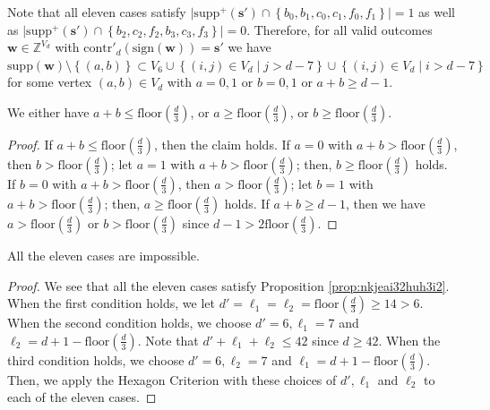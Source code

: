 Note that all eleven cases satisfy \( \lvert \mathrm{supp}^+(\mathbf{s}') \cap \left\{b_0, b_1, c_0, c_1, f_0, f_1 \right\} \rvert = 1 \) as well as \( \lvert \mathrm{supp}^+(\mathbf{s}') \cap \left\{b_2, c_2, f_2, b_3, c_3, f_3 \right\} \rvert = 0 \).
Therefore, for all valid outcomes \( \mathbf{w} \in \mathbb{Z}^{V_d} \) with \( \mathrm{contr}'_d(\mathrm{sign}(\mathbf{w})) = \mathbf{s}' \) we have \( \mathrm{supp}(\mathbf{w}) \setminus \left\{ (a,b) \right\} \subset V_6 \cup \left\{ (i,j) \in V_d \mid j > d - 7 \right\}  \cup \left\{ (i,j) \in V_d \mid i > d - 7 \right\}  \)
for some vertex \( (a,b) \in V_d \) with \( a = 0,1 \) or \( b=0,1 \) or \( a + b \geq d-1 \).

\begin{proposition}\label{prop:nkjeai32huh3i2}
    We either have  \( a + b \leq \mathrm{floor}(\frac{d}{3}) \), or \( a \geq \mathrm{floor}(\frac{d}{3}) \), or \( b \geq \mathrm{floor}(\frac{d}{3}) \).
\end{proposition}

\begin{proof}
    If \( a + b \leq \mathrm{floor}(\frac{d}{3}) \), then the claim holds. If \( a = 0 \) with \( a + b > \mathrm{floor}(\frac{d}{3}) \), then \( b > \mathrm{floor}(\frac{d}{3}) \); let \( a = 1 \) with \( a + b > \mathrm{floor}(\frac{d}{3}) \); then, \( b \geq \mathrm{floor}(\frac{d}{3}) \) holds. If \( b = 0 \) with \( a + b > \mathrm{floor}(\frac{d}{3}) \), then \( a > \mathrm{floor}(\frac{d}{3}) \); let \( b = 1 \) with \( a + b > \mathrm{floor}(\frac{d}{3}) \); then, \( a \geq \mathrm{floor}(\frac{d}{3}) \) holds. If \( a + b \geq d-1  \), then we have \( a > \mathrm{floor}(\frac{d}{3}) \) or \( b > \mathrm{floor}(\frac{d}{3}) \) since \( d-1 > 2 \mathrm{floor}(\frac{d}{3}) \).
\end{proof}

\begin{proposition}
    All the eleven cases are impossible.
\end{proposition}

\begin{proof}
    We see that all the eleven cases satisfy Proposition \ref{prop:nkjeai32huh3i2}. When the first condition holds, we let \( d' = \ell_1 = \ell_2 = \mathrm{floor}(\frac{d}{3}) \geq 14 > 6 \). When the second condition holds, we choose \( d' = 6, \ell_1 = 7 \) and \( \ell_2 = d + 1 - \mathrm{floor}(\frac{d}{3}) \). Note that \( d' + \ell_1 + \ell_2 \leq 42 \) since \( d \geq 42 \). When the third condition holds, we choose  \( d' = 6, \ell_2 = 7 \) and \( \ell_1 = d + 1 - \mathrm{floor}(\frac{d}{3}) \). Then, we apply the Hexagon Criterion with these choices of \( d', \ell_1 \) and \( \ell_2 \) to each of the eleven cases.
\end{proof}



